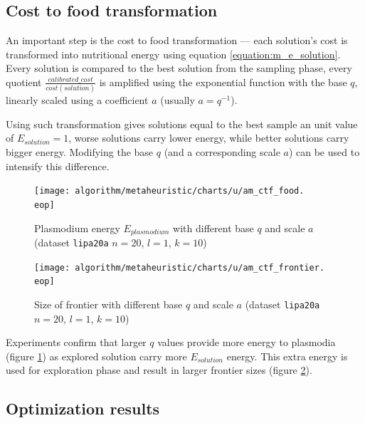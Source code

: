 \documentclass[english,a4paper,twoside]{ppfcmthesis}
\begin{document}
\subsection{Cost to food transformation}

An important step is the cost to food transformation --- each solution's cost is transformed into nutritional energy using equation \ref{equation:m_e_solution}. Every solution is compared to the best solution from the sampling phase, every quotient $\frac{calibrated\_cost}{cost(solution)}$ is amplified using the exponential function with the base $q$, linearly scaled using a coefficient $a$ (usually $a=q^{-1}$).

Using such transformation gives solutions equal to the best sample an unit value of $E_{solution}=1$, worse solutions carry lower energy, while better solutions carry bigger energy. Modifying the base $q$ (and a corresponding scale $a$) can be used to intensify this difference.

\begin{figure}
  \centering

  \texttt{[image: algorithm/metaheuristic/charts/u/am\_ctf\_food.\\eop]}

  \caption{Plasmodium energy $E_{plasmodium}$ with different base $q$ and scale $a$ (dataset \texttt{lipa20a} $n=20$, $l=1$, $k=10$)}
  \label{figure:am_ctf_food}
\end{figure}

\begin{figure}
  \centering

  \texttt{[image: algorithm/metaheuristic/charts/u/am\_ctf\_frontier.\\eop]}

  \caption{Size of frontier with different base $q$ and scale $a$ (dataset \texttt{lipa20a} $n=20$, $l=1$, $k=10$)}
  \label{figure:am_ctf_frontier}
\end{figure}

Experiments confirm that larger $q$ values provide more energy to plasmodia (figure \ref{figure:am_ctf_food}) as explored solution carry more $E_{solution}$ energy. This extra energy is used for exploration phase and result in larger frontier sizes (figure \ref{figure:am_ctf_frontier}).


\subsection{Optimization results}
\end{document}

